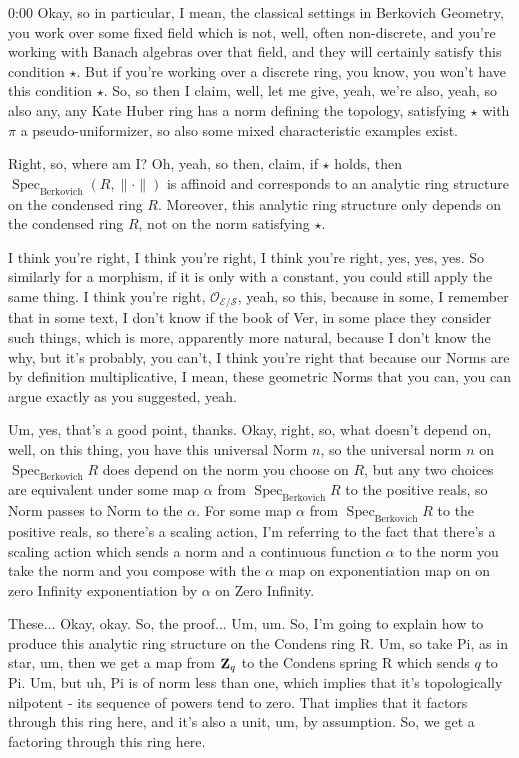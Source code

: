 \begin{unfinished}{0:00}
Okay, so in particular, I mean, the classical settings in Berkovich Geometry, you work over some fixed field which is not, well, often non-discrete, and you're working with Banach algebras over that field, and they will certainly satisfy this condition $\star$. But if you're working over a discrete ring, you know, you won't have this condition $\star$. So, so then I claim, well, let me give, yeah, we're also, yeah, so also any, any Kate Huber ring has a norm defining the topology, satisfying $\star$ with $\pi$ a pseudo-uniformizer, so also some mixed characteristic examples exist.

Right, so, where am I? Oh, yeah, so then, claim, if $\star$ holds, then $\operatorname{Spec}_{\mathrm{Berkovich}} (R, \|\cdot\|)$ is affinoid and corresponds to an analytic ring structure on the condensed ring $R$. Moreover, this analytic ring structure only depends on the condensed ring $R$, not on the norm satisfying $\star$.

I think you're right, I think you're right, I think you're right, yes, yes, yes. So similarly for a morphism, if it is only with a constant, you could still apply the same thing. I think you're right, $\mathcal{O}_{\mathcal{E}/\mathcal{S}}$, yeah, so this, because in some, I remember that in some text, I don't know if the book of Ver, in some place they consider such things, which is more, apparently more natural, because I don't know the why, but it's probably, you can't, I think you're right that because our Norms are by definition multiplicative, I mean, these geometric Norms that you can, you can argue exactly as you suggested, yeah.

Um, yes, that's a good point, thanks. Okay, right, so, what doesn't depend on, well, on this thing, you have this universal Norm $n$, so the universal norm $n$ on $\operatorname{Spec}_{\mathrm{Berkovich}} R$ does depend on the norm you choose on $R$, but any two choices are equivalent under some map $\alpha$ from $\operatorname{Spec}_{\mathrm{Berkovich}} R$ to the positive reals, so Norm passes to Norm to the $\alpha$. For some map $\alpha$ from $\operatorname{Spec}_{\mathrm{Berkovich}} R$ to the positive reals, so there's a scaling action, I'm referring to the fact that there's a scaling action which sends a norm and a continuous function $\alpha$ to the norm you take the norm and you compose with the $\alpha$ map on exponentiation map on on zero Infinity exponentiation by $\alpha$ on Zero Infinity.

These... Okay, okay. So, the proof... Um, um. So, I'm going to explain how to produce this analytic ring structure on the Condens ring R. Um, so take Pi, as in star, um, then we get a map from $\mathbf Z_q$ to the Condens spring R which sends $q$ to Pi. Um, but uh, Pi is of norm less than one, which implies that it's topologically nilpotent - its sequence of powers tend to zero. That implies that it factors through this ring here, and it's also a unit, um, by assumption. So, we get a factoring through this ring here.


\end{unfinished}
